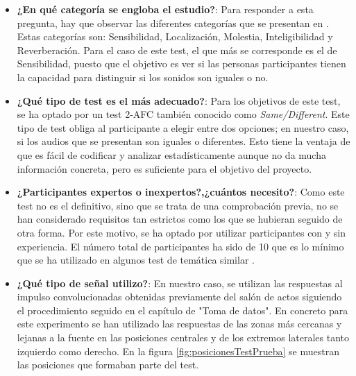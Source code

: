 \documentclass[11pt,a4paper]{book}
\begin{document}
                \begin{itemize}
                    \item \textbf{¿En qué categoría se engloba el estudio?}: Para responder a esta pregunta, hay que observar las diferentes categorías que se presentan en \cite{Tejada2020}. Estas categorías son: Sensibilidad, Localización, Molestia, Inteligibilidad y Reverberación. Para el caso de este test, el que más se corresponde es el de Sensibilidad, puesto que el objetivo es ver si las personas participantes tienen la capacidad para distinguir si los sonidos son iguales o no.
                    \item \textbf{¿Qué tipo de test es el más adecuado?}: Para los objetivos de este test, se ha optado por un test 2-AFC también conocido como \textit{Same/Different}. Este tipo de test obliga al participante a elegir entre dos opciones; en nuestro caso, si los audios que se presentan son iguales o diferentes. Esto tiene la ventaja de que es fácil de codificar y analizar estadísticamente aunque no da mucha información concreta, pero es suficiente para el objetivo del proyecto.
                    \item \textbf{¿Participantes expertos o inexpertos?,¿cuántos necesito?}: Como este test no es el definitivo, sino que se trata de una comprobación previa, no se han considerado requisitos tan estrictos como los que se hubieran seguido de otra forma. Por este motivo, se ha optado por utilizar participantes con y sin experiencia. El número total de participantes ha sido de 10 que es lo mínimo que se ha utilizado en algunos test de temática similar \cite{2019MNowak}.
                    \item \textbf{¿Qué tipo de señal utilizo?}: En nuestro caso, se utilizan las respuestas al impulso convolucionadas obtenidas previamente del salón de actos siguiendo el procedimiento seguido en el capítulo de "Toma de datos". En concreto para este experimento se han utilizado las respuestas de las zonas más cercanas y lejanas a la fuente en las posiciones centrales y de los extremos laterales tanto izquierdo como derecho. En la figura \ref{fig:posicionesTestPrueba} se muestran las posiciones que formaban parte del test.
                    

\end{itemize}
\end{document}
